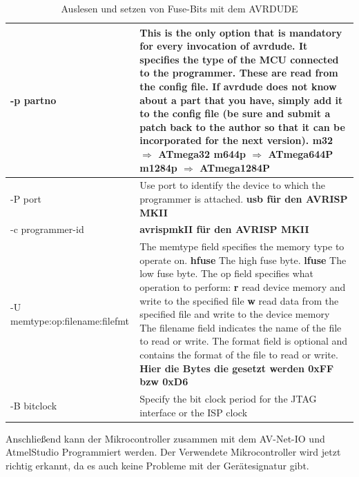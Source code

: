 \begin{table}[H]
\begin{tabular}{| p{} | p{} |}
\hline
-p partno & This is the only option that is mandatory for every invocation of
avrdude.  It specifies the type of the MCU connected to the programmer. These
are read from the config file.  If avrdude does not know about a part that you
have, simply add it to the config file (be sure and submit a patch back to the
author so that it can be incorporated for the next version). \newline
\textbf{m32 $\Rightarrow$ ATmega32} \newline 
\textbf{m644p $\Rightarrow$ ATmega644P} \newline
\textbf{m1284p $\Rightarrow$ ATmega1284P} \\ \hline
-P port & Use port to identify the device to which the programmer is attached. \textbf{usb für den AVRISP MKII}  \\ \hline 
-c programmer-id & \textbf{avrispmkII für den AVRISP MKII} \\ \hline
-U \hbox{memtype:op:filename:filefmt} &  
The \textrm{memtype} field specifies the memory type to operate on.\newline
\textbf{hfuse} The high fuse byte.\newline
\textbf{lfuse} The low fuse byte.\newline
The \textrm{op} field specifies what operation to perform:\newline
\textbf{r} read device memory and write to the specified file\newline
\textbf{w} read data from the specified file and write to the device memory \newline
The filename field indicates the name of the file to read or write.  The format field is optional and contains the format of the file to read or write. \newline
\textbf{Hier die Bytes die gesetzt werden 0xFF bzw 0xD6} \\ \hline
-B bitclock & Specify the bit clock period for the JTAG interface or the ISP clock \\ \hline
\end{tabular}
\caption{Auslesen und setzen von Fuse-Bits mit dem AVRDUDE}
\label{parameterAvrdude2}
\end{table}
Anschließend kann der Mikrocontroller zusammen mit dem AV-Net-IO und AtmelStudio
Programmiert werden. Der Verwendete Mikrocontroller wird jetzt richtig erkannt,
da es auch keine Probleme mit der Gerätesignatur gibt.

